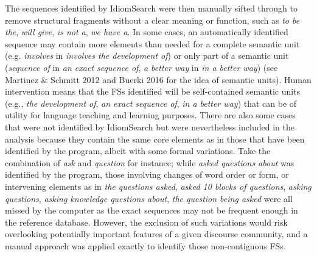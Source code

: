 \begin{styleStandard}
The sequences identified by IdiomSearch were then manually sifted through to remove structural fragments without a clear meaning or function, such as \textit{to be the}, \textit{will give}, \textit{is not a}, \textit{we have a}. In some cases, an automatically identified sequence may contain more elements than needed for a complete semantic unit (e.g. \textit{involves }in \textit{involves the development of}) or only part of a semantic unit (\textit{sequence of} in \textit{an exact sequence of}, \textit{a better way }in \textit{in a better way}) (see Martinez \& Schmitt 2012 and Buerki 2016 for the idea of semantic units). Human intervention means that the FSs identified will be self-contained semantic units (e.g., \textit{the development of}, \textit{an exact sequence of}, \textit{in a better way}) that can be of utility for language teaching and learning purposes. There are also some cases that were not identified by IdiomSearch but were nevertheless included in the analysis because they contain the same core elements as in those that have been identified by the program, albeit with some formal variations. Take the combination of \textit{ask} and \textit{question} for instance; while \textit{asked questions about} was identified by the program, those involving changes of word order or form, or intervening elements as in \textit{the questions asked}, \textit{asked 10 blocks of questions}, \textit{asking questions}, \textit{asking knowledge questions about}, \textit{the question being asked} were all missed by the computer as the exact sequences may not be frequent enough in the reference database. However, the exclusion of such variations would risk overlooking potentially important features of a given discourse community, and a manual approach was applied exactly to identify those non-contiguous FSs.
\end{styleStandard}

